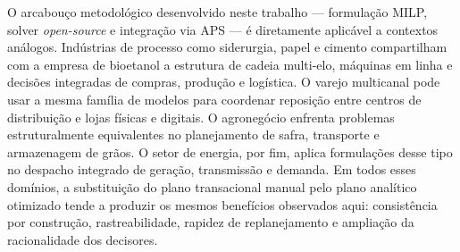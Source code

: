 \documentclass[11pt,a4paper]{article}
\begin{document}
O arcabouço metodológico desenvolvido neste trabalho --- formulação MILP, solver \emph{open-source} e integração via APS --- é diretamente aplicável a contextos análogos. Indústrias de processo como siderurgia, papel e cimento compartilham com a empresa de bioetanol a estrutura de cadeia multi-elo, máquinas em linha e decisões integradas de compras, produção e logística. O varejo multicanal pode usar a mesma família de modelos para coordenar reposição entre centros de distribuição e lojas físicas e digitais. O agronegócio enfrenta problemas estruturalmente equivalentes no planejamento de safra, transporte e armazenagem de grãos. O setor de energia, por fim, aplica formulações desse tipo no despacho integrado de geração, transmissão e demanda. Em todos esses domínios, a substituição do plano transacional manual pelo plano analítico otimizado tende a produzir os mesmos benefícios observados aqui: consistência por construção, rastreabilidade, rapidez de replanejamento e ampliação da racionalidade dos decisores.



\end{document}

